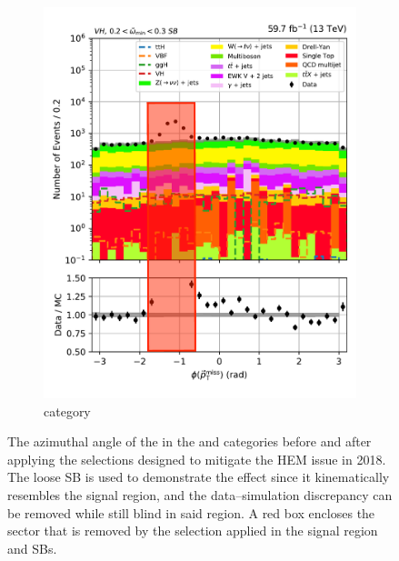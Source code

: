 \begin{figure}[htbp]
    \hspace{0.05\textwidth}
    \begin{subfigure}[b]{0.34\textwidth}
        \includegraphics[width=\textwidth]{figures/hem_issue/sideband_4/met_phi/met_phi_VH_before_annotated.pdf}
        \caption{\VH category}
    \end{subfigure}
    \caption[The azimuthal angle of the \ptvecmiss in the \ttH and \VH categories before and after applying the selections designed to mitigate the HEM issue in 2018]{The azimuthal angle of the \ptvecmiss in the \ttH and \VH categories before and after applying the selections designed to mitigate the HEM issue in 2018. The loose \omegaTilde \gls{SB} is used to demonstrate the effect since it kinematically resembles the signal region, and the data--simulation discrepancy can be removed while still blind in said region. A red box encloses the sector that is removed by the selection applied in the signal region and \glspl{SB}.}
    \label{fig:htoinv_hem_issue_met_phi}
\end{figure}

